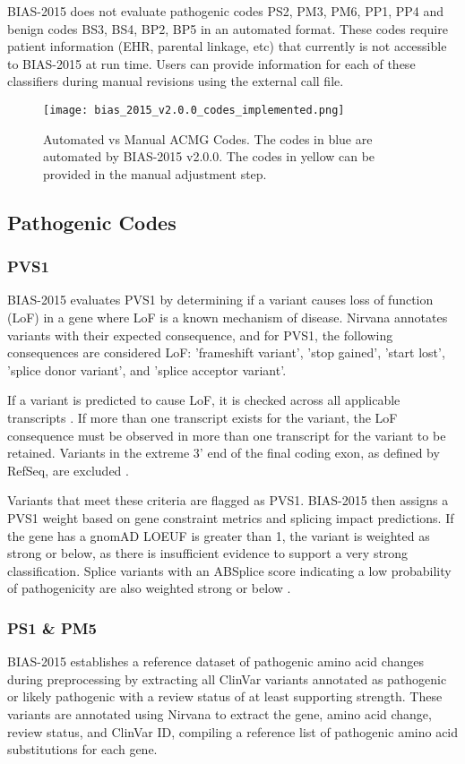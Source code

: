 \documentclass[unnumsec,webpdf,contemporary,large]{oup-authoring-template}
\theoremstyle{thmstyleone}
\theoremstyle{thmstyletwo}
\theoremstyle{thmstylethree}
\begin{document}
BIAS-2015 does not evaluate pathogenic codes PS2, PM3, PM6, PP1, PP4 and benign codes BS3, BS4, BP2, BP5 in an automated format. These codes require patient information (EHR, parental linkage, etc) that currently is not accessible to BIAS-2015 at run time. Users can provide information for each of these classifiers during manual revisions using the external call file.

\begin{figure}[!t]%
\centering
\texttt{[image: bias\_2015\_v2.0.0\_codes\_implemented.png]}
\caption{Automated vs Manual ACMG Codes. The codes in blue are automated by BIAS-2015 v2.0.0. The codes in yellow can be provided in the manual adjustment step.}
\label{fig:automated_vs_manual_codes}
\end{figure}

\subsection{Pathogenic Codes}
\subsubsection{PVS1}
BIAS-2015 evaluates PVS1 by determining if a variant causes loss of function (LoF) in a gene where LoF is a known mechanism of disease. Nirvana annotates variants with their expected consequence, and for PVS1, the following consequences are considered LoF: 'frameshift variant', 'stop gained', 'start lost', 'splice donor variant', and 'splice acceptor variant'.

If a variant is predicted to cause LoF, it is checked across all applicable transcripts \cite{abou2018recommendations} . If more than one transcript exists for the variant, the LoF consequence must be observed in more than one transcript for the variant to be retained. Variants in the extreme 3' end of the final coding exon, as defined by RefSeq, are excluded \cite{pruitt2014refseq}.

Variants that meet these criteria are flagged as PVS1. BIAS-2015 then assigns a PVS1 weight based on gene constraint metrics and splicing impact predictions. If the gene has a gnomAD LOEUF is greater than 1, the variant is weighted as strong or below, as there is insufficient evidence to support a very strong classification. Splice variants with an ABSplice score indicating a low probability of pathogenicity are also weighted strong or below \cite{cheng2019mmsplice}.

\subsubsection{PS1 \& PM5}
BIAS-2015 establishes a reference dataset of pathogenic amino acid changes during preprocessing by extracting all ClinVar variants annotated as pathogenic or likely pathogenic with a review status of at least supporting strength. These variants are annotated using Nirvana to extract the gene, amino acid change, review status, and ClinVar ID, compiling a reference list of pathogenic amino acid substitutions for each gene.
\end{document}
